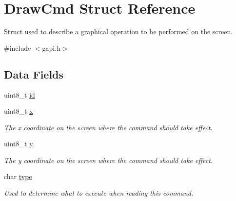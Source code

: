 \hypertarget{struct_draw_cmd}{}\section{Draw\+Cmd Struct Reference}
\label{struct_draw_cmd}


Struct used to describe a graphical operation to be performed on the screen.  




{\ttfamily \#include $<$gapi.\+h$>$}

\subsection*{Data Fields}
\begin{DoxyCompactItemize}
\item 
uint8\+\_\+t \mbox{\hyperlink{struct_draw_cmd_a1e6927fa1486224044e568f9c370519b}{id}}
\item 
\mbox{\label{struct_draw_cmd_a0f561e77fa0f040b637f4e04f6cd8078}} 
uint8\+\_\+t \mbox{\hyperlink{struct_draw_cmd_a0f561e77fa0f040b637f4e04f6cd8078}{x}}
\begin{DoxyCompactList}\small\item\em The x coordinate on the screen where the command should take effect. \end{DoxyCompactList}\item 
\mbox{\label{struct_draw_cmd_a17f97f62d93bc8cfb4a2b5d273a2aa72}} 
uint8\+\_\+t \mbox{\hyperlink{struct_draw_cmd_a17f97f62d93bc8cfb4a2b5d273a2aa72}{y}}
\begin{DoxyCompactList}\small\item\em The y coordinate on the screen where the command should take effect. \end{DoxyCompactList}\item 
\mbox{\label{struct_draw_cmd_aff17911edc8208aa8ddb1c7c52c78389}} 
char \mbox{\hyperlink{struct_draw_cmd_aff17911edc8208aa8ddb1c7c52c78389}{type}}
\begin{DoxyCompactList}\small\item\em Used to determine what to execute when reading this command. \end{DoxyCompactList}\item 
\mbox{\label{struct_draw_cmd_af714e69444763fb9a76ec901a014baf1}} 

\end{DoxyCompactItemize}
